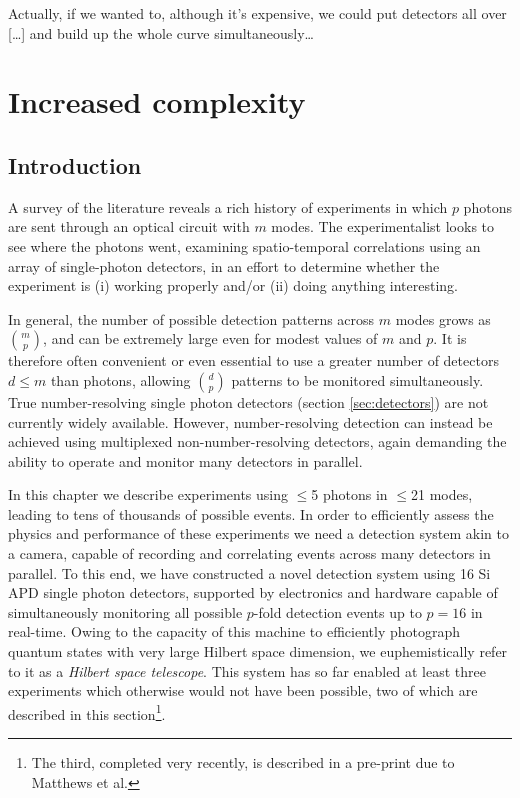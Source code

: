 \begin{savequote}[90mm] 
Actually, if we wanted to, although it's expensive, we could put detectors all over [\ldots] and build up the whole curve simultaneously\ldots
{} 
\end{savequote}

\chapter{Increased complexity}
\label{chap:hilbert-space-telescope}
\section{Introduction}
A survey of the literature reveals a rich history of experiments in which $p$ photons are sent through an optical circuit with $m$ modes. The experimentalist looks to see where the photons went, examining spatio-temporal correlations using an array of single-photon detectors, in an effort to determine whether the experiment is (i) working properly and/or (ii) doing anything interesting.  

In general, the number of possible detection patterns across $m$ modes grows as ${m \choose p}$, and can be extremely large even for modest values of $m$ and $p$. 
It is therefore often convenient or even essential to use a greater number of detectors $d\le m$ than photons, allowing ${d \choose p}$ patterns to be monitored simultaneously. 
True number-resolving single photon detectors (section \ref{sec:detectors}) are not currently widely available.  However, number-resolving detection can instead be achieved using multiplexed non-number-resolving detectors, again demanding the ability to operate and monitor many detectors in parallel.

In this chapter we describe experiments using $\le$5 photons in $\le$21 modes, leading to tens of thousands of possible events. In order to efficiently assess the physics and performance of these experiments we need a detection system akin to a camera, capable of recording and correlating events across many detectors in parallel. To this end, we have constructed a novel detection system using 16 Si APD single photon detectors, supported by electronics and hardware capable of simultaneously monitoring all possible $p$-fold detection events up to $p=16$ in real-time. Owing to the capacity of this machine to efficiently photograph quantum states with very large Hilbert space dimension, we euphemistically refer to it as a \emph{Hilbert space telescope}.  This system has so far enabled at least three experiments which otherwise would not have been possible, two of which are described in this section\footnote{The third, completed very recently, is described in a pre-print \cite{Matthews2013b} due to Matthews et al.}.

